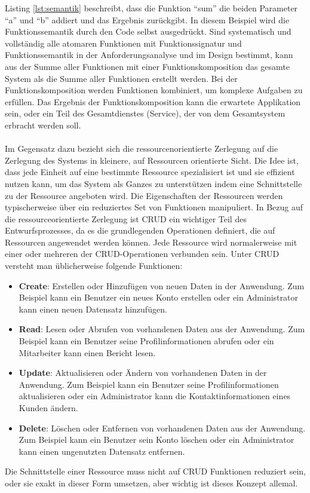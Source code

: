 Listing \ref{lst:semantik} beschreibt, dass die Funktion \enquote{sum} die beiden Parameter \enquote{a} und \enquote{b} addiert und das Ergebnis zurückgibt. In diesem Beispiel wird die Funktionssemantik durch den Code selbst ausgedrückt. Sind systematisch und vollständig alle atomaren Funktionen mit Funktionssignatur und Funktionssemantik in der Anforderungsanalyse und im Design bestimmt, kann aus der Summe aller Funktionen mit einer Funktionskomposition das gesamte System als die Summe aller Funktionen erstellt werden. Bei der Funktionskomposition werden Funktionen kombiniert, um komplexe Aufgaben zu erfüllen. Das Ergebnis der Funktionskomposition kann die erwartete Applikation sein, oder ein Teil des Gesamtdienstes (Service), der von dem Gesamtsystem erbracht werden soll. 
\\\\
Im Gegensatz dazu bezieht sich die ressourcenorientierte Zerlegung auf die Zerlegung des Systems in kleinere, auf Ressourcen orientierte Sicht. Die Idee ist, dass jede Einheit auf eine bestimmte Ressource spezialisiert ist und sie effizient nutzen kann, um das System als Ganzes zu unterstützen indem eine Schnittstelle zu der Ressource angeboten wird. Die Eigenschaften der Ressourcen werden typischerweise über ein reduziertes Set von Funktionen manipuliert.  In Bezug auf die ressourceorientierte Zerlegung ist CRUD ein wichtiger Teil des Entwurfsprozesses, da es die grundlegenden Operationen definiert, die auf Ressourcen angewendet werden können. Jede Ressource wird normalerweise mit einer oder mehreren der CRUD-Operationen verbunden sein.
Unter CRUD versteht man üblicherweise folgende Funktionen:

\begin{itemize}
\item \textbf{Create}: Erstellen oder Hinzufügen von neuen Daten in der Anwendung. Zum Beispiel kann ein Benutzer ein neues Konto erstellen oder ein Administrator kann einen neuen Datensatz hinzufügen.

\item \textbf{Read}: Lesen oder Abrufen von vorhandenen Daten aus der Anwendung. Zum Beispiel kann ein Benutzer seine Profilinformationen abrufen oder ein Mitarbeiter kann einen Bericht lesen.

\item \textbf{Update}: Aktualisieren oder Ändern von vorhandenen Daten in der Anwendung. Zum Beispiel kann ein Benutzer seine Profilinformationen aktualisieren oder ein Administrator kann die Kontaktinformationen eines Kunden ändern.

\item \textbf{Delete}: Löschen oder Entfernen von vorhandenen Daten aus der Anwendung. Zum Beispiel kann ein Benutzer sein Konto löschen oder ein Administrator kann einen ungenutzten Datensatz entfernen.
\end{itemize}
Die Schnittstelle einer Ressource muss nicht auf CRUD Funktionen reduziert sein, oder sie exakt in dieser Form umsetzen, aber wichtig ist dieses Konzept allemal.
\\\\

